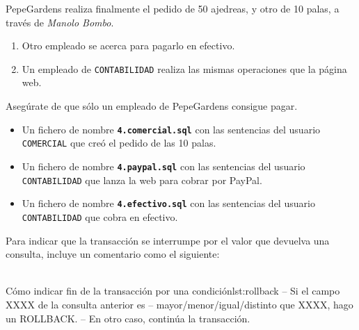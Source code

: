 \begin{homeworkProblem}
  PepeGardens realiza finalmente el pedido de 50 ajedreas, y otro de 10 palas, a través
  de \textit{Manolo Bombo}.

  {

    \begin{enumerate}
    \item Otro empleado se acerca para pagarlo en efectivo.
    \item Un empleado de \texttt{CONTABILIDAD} realiza las mismas operaciones que la página web.
    \end{enumerate}
  }
  Asegúrate de que sólo un empleado de PepeGardens consigue pagar.
  \begin{Aviso}
    \begin{itemize}
    \item Un fichero de nombre \texttt{\textbf{4.comercial.sql}} con las sentencias del usuario \texttt{COMERCIAL} que creó el pedido de las 10 palas.
    \item Un fichero de nombre \texttt{\textbf{4.paypal.sql}}  con las sentencias del usuario \texttt{CONTABILIDAD} que lanza la web para cobrar por PayPal.
    \item Un fichero de nombre \texttt{\textbf{4.efectivo.sql}}  con las sentencias del usuario \texttt{CONTABILIDAD} que cobra en efectivo.
    \end{itemize}

    Para indicar que la transacción se interrumpe por el valor que devuelva una consulta, incluye un comentario como el siguiente:
    \\
    \\
\begin{listadosql}{Cómo indicar fin de la transacción por una condición}{lst:rollback}
-- Si el campo XXXX de la consulta anterior es
-- mayor/menor/igual/distinto que XXXX, hago un ROLLBACK.
-- En otro caso, continúa la transacción.
\end{listadosql}
    

  \end{Aviso}

\end{homeworkProblem}


